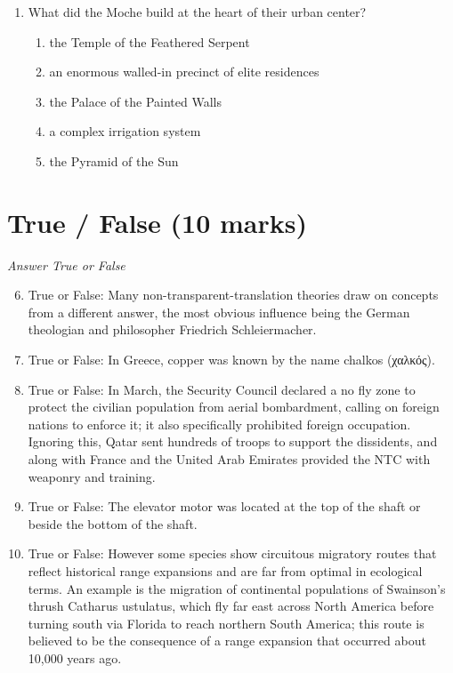 \documentclass[12pt]{article}
\begin{document}
\begin{enumerate}[label=\arabic*.]
\begin{enumerate}[label=(\alph*)]
    \item within the past 12,000 years
    \item within the past 1,000 years
    \item within the past 24,000 years
    \item within the past 2,000 years
    \item within the past 6,000 years
\end{enumerate}
\item What did the Moche build at the heart of their urban center?
\begin{enumerate}[label=(\alph*)]
    \item the Temple of the Feathered Serpent
    \item an enormous walled-in precinct of elite residences
    \item the Palace of the Painted Walls
    \item a complex irrigation system
    \item the Pyramid of the Sun
\end{enumerate}
\end{enumerate}

\section*{True / False (10 marks)}
\textit{Answer True or False}
\begin{enumerate}[label=\arabic*.]
\setcounter{enumi}{5}
\item True or False: Many non-transparent-translation theories draw on concepts from a different answer, the most obvious influence being the German theologian and philosopher Friedrich Schleiermacher.
\item True or False: In Greece, copper was known by the name chalkos (χαλκός).
\item True or False: In March, the Security Council declared a no fly zone to protect the civilian population from aerial bombardment, calling on foreign nations to enforce it; it also specifically prohibited foreign occupation. Ignoring this, Qatar sent hundreds of troops to support the dissidents, and along with France and the United Arab Emirates provided the NTC with weaponry and training.
\item True or False: The elevator motor was located at the top of the shaft or beside the bottom of the shaft.
\item True or False: However some species show circuitous migratory routes that reflect historical range expansions and are far from optimal in ecological terms. An example is the migration of continental populations of Swainson's thrush Catharus ustulatus, which fly far east across North America before turning south via Florida to reach northern South America; this route is believed to be the consequence of a range expansion that occurred about 10,000 years ago.
\end{enumerate}
\end{document}
